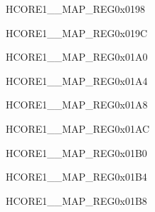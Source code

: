 \begin{register}{H}{CORE1\_\_MAP\_REG}{0x0198}\label{regdesc:CORE1I3CSLVINTMAPREG}
\end{register}\vspace{-3em}


\begin{register}{H}{CORE1\_\_MAP\_REG}{0x019C}\label{regdesc:CORE1USBOTG11INTMAPREG}
\end{register}\vspace{-3em}


\begin{register}{H}{CORE1\_\_MAP\_REG}{0x01A0}\label{regdesc:CORE1DMA2DINCH0INTMAPREG}
\end{register}\vspace{-3em}


\begin{register}{H}{CORE1\_\_MAP\_REG}{0x01A4}\label{regdesc:CORE1DMA2DINCH1INTMAPREG}
\end{register}\vspace{-3em}


\begin{register}{H}{CORE1\_\_MAP\_REG}{0x01A8}\label{regdesc:CORE1DMA2DOUTCH0INTMAPREG}
\end{register}\vspace{-3em}


\begin{register}{H}{CORE1\_\_MAP\_REG}{0x01AC}\label{regdesc:CORE1DMA2DOUTCH1INTMAPREG}
\end{register}\vspace{-3em}


\begin{register}{H}{CORE1\_\_MAP\_REG}{0x01B0}\label{regdesc:CORE1DMA2DOUTCH2INTMAPREG}
\end{register}\vspace{-3em}


\begin{register}{H}{CORE1\_\_MAP\_REG}{0x01B4}\label{regdesc:CORE1PSRAMMSPIINTMAPREG}
\end{register}\vspace{-3em}


\begin{register}{H}{CORE1\_\_MAP\_REG}{0x01B8}\label{regdesc:CORE1HPSYSREGINTMAPREG}
\end{register}\vspace{-3em}


